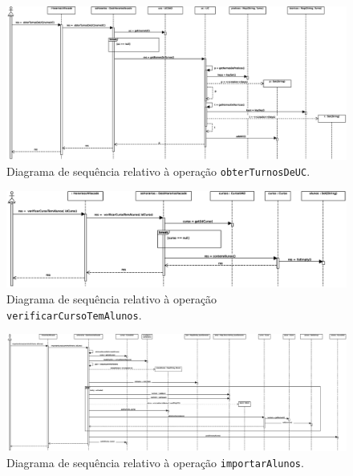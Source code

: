 \documentclass[12pt, a4paper]{article}
\begin{document}
\begin{landscape}
        \begin{figure}[H]
            \centering
            \includegraphics[scale=0.60]{Imagens/Modelos/obterTurnosDeUCDAO.svg.eps}
            \caption{
                Diagrama de sequência relativo à operação \texttt{obterTurnosDeUC}.
            }
        \end{figure}

        \vspace*{\fill}
        \pagebreak
        \vspace*{\fill}

        \begin{figure}[H]
            \centering
            \includegraphics[scale=0.75]{Imagens/Modelos/verificarCursoTemAlunosDAO.svg.eps}
            \caption{
                Diagrama de sequência relativo à operação \texttt{verificarCursoTemAlunos}.
            }
        \end{figure}

        \vspace*{\fill}
        \pagebreak
        \vspace*{\fill}

        \begin{figure}[H]
            \centering
            \includegraphics[scale=0.40]{Imagens/Modelos/importarAlunosDAO.svg.eps}
            \caption{
                Diagrama de sequência relativo à operação \texttt{importarAlunos}.
            }
        \end{figure}


\end{landscape}
\end{document}
